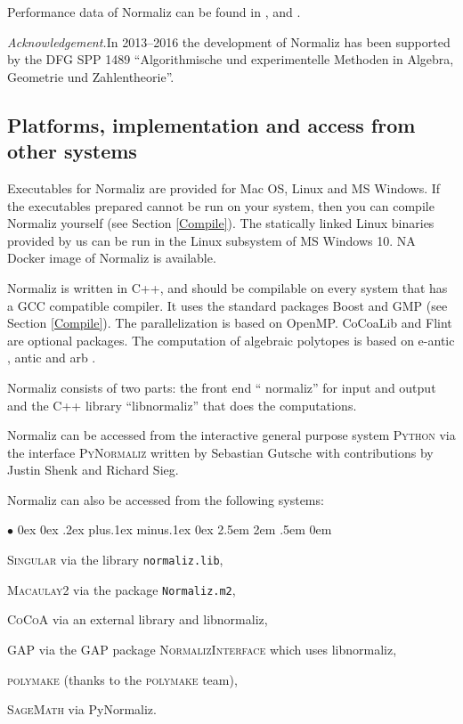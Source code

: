 \documentclass[12pt,a4paper]{scrartcl}
\newcommand{\stdli}{ \topsep0ex \partopsep0ex %
\parsep.2ex plus.1ex minus.1ex \itemsep0ex%
\leftmargin2.5em \labelwidth2em \labelsep.5em \rightmargin0em}%
\renewenvironment{itemize}{\begin{list}{{$\bullet$}}{\stdli}}{\end{list}}
\theoremstyle{definition}
\def\ttt{\texttt}
\begin{document}
Performance data of Normaliz can be found in \cite{BI2}, \cite{BIS} and \cite{BIS2}.

\emph{Acknowledgement.}\enspace In 2013--2016 the development of Normaliz has been supported by the DFG SPP 1489  ``Algorithmische und ex\-pe\-rimentelle Methoden in Algebra, Geometrie und Zahlentheorie''.

\subsection{Platforms, implementation and access from other systems}

Executables for Normaliz are provided for Mac OS, Linux and MS Windows. If the executables prepared cannot be run on your system, then you can  compile Normaliz yourself (see Section \ref{Compile}). The statically linked Linux binaries provided by us  can be run in the Linux subsystem of MS Windows 10. NA Docker image of Normaliz is available.

Normaliz is written in C++, and should be compilable on every system that has a GCC compatible compiler. It uses the standard packages Boost and GMP (see Section \ref{Compile}). The parallelization is based on OpenMP. CoCoaLib \cite{CoCoA} and Flint \cite{Flint} are optional packages. The computation of algebraic polytopes is based on e-antic \cite{e-antic}, antic \cite{antic}and arb \cite{arb}.

Normaliz consists of two parts: the front end `` normaliz'' for input and output and the C++ library ``libnormaliz'' that does the computations.

Normaliz can be accessed from the interactive general purpose system \textsc{Python} via the interface \textsc{PyNormaliz} written by Sebastian Gutsche with contributions by Justin Shenk and Richard Sieg.

Normaliz can also be accessed from the following systems:
\begin{itemize}
	\item \textsc{Singular} via the library \ttt{normaliz.lib},
	\item \textsc{Macaulay2} via the package \ttt{Normaliz.m2},
	\item \textsc{CoCoA} via an external library and libnormaliz,
	\item \textsc{GAP} via the GAP package \textsc{NormalizInterface} \cite{GAP-NmzInterface} which uses libnormaliz,
	\item \textsc{polymake} (thanks to the \textsc{polymake}
	team),
	\item \textsc{SageMath} via PyNormaliz.
\end{itemize}
\end{document}
